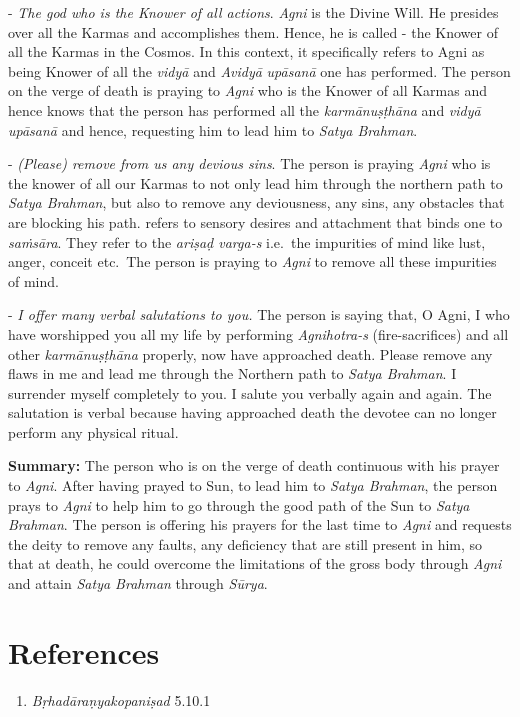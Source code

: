 - \emph{The god who is the Knower of all actions}. \emph{Agni} is the Divine Will. He presides over all the Karmas and accomplishes them. Hence, he is called - the Knower of all the Karmas in the Cosmos. In this context, it specifically refers to Agni as being Knower of all the \emph{vidyā} and \emph{Avidyā} \emph{upāsanā} one has performed. The person on the verge of death is praying to \emph{Agni} who is the Knower of all Karmas and hence knows that the person has performed all the \emph{karmānuṣṭhāna} and \emph{vidyā} \emph{upāsanā} and hence, requesting him to lead him to \emph{Satya Brahman}.

- \emph{(Please) remove from us any devious sins}. The person is praying \emph{Agni} who is the knower of all our Karmas to not only lead him through the northern path to \emph{Satya Brahman}, but also to remove any deviousness, any sins, any obstacles that are blocking his path.  refers to sensory desires and attachment that binds one to \emph{saṁsāra}. They refer to the \emph{ariṣaḍ varga-s} i.e.\ the impurities of mind like lust, anger, conceit etc.\ The person is praying to \emph{Agni} to remove all these impurities of mind.

- \emph{I offer many verbal salutations to you.} The person is saying that, O Agni, I who have worshipped you all my life by performing \emph{Agnihotra-s} (fire-sacrifices) and all other \emph{karmānuṣṭhāna} properly, now have approached death. Please remove any flaws in me and lead me through the Northern path to \emph{Satya Brahman}. I surrender myself completely to you. I salute you verbally again and again. The salutation is verbal because having approached death the devotee can no longer perform any physical ritual.

\textbf{Summary:} The person who is on the verge of death continuous with his prayer to \emph{Agni}. After having prayed to Sun, to lead him to \emph{Satya Brahman}, the person prays to \emph{Agni} to help him to go through the good path of the Sun to \emph{Satya Brahman}. The person is offering his prayers for the last time to \emph{Agni} and requests the deity to remove any faults, any deficiency that are still present in him, so that at death, he could overcome the limitations of the gross body through \emph{Agni} and attain \emph{Satya Brahman} through \emph{Sūrya}.

\section*{References}

\begin{enumerate}
\itemsep=0pt
\item
  \emph{Bṛhadāraṇyakopaniṣad} 5.10.1
\end{enumerate}


